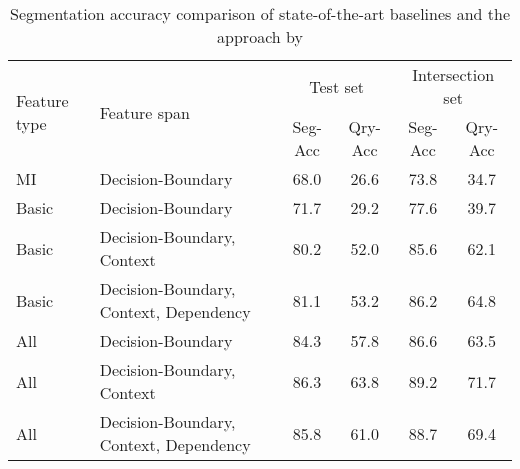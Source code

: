 \begin{table*}[t]
 \caption{Segmentation accuracy comparison of state-of-the-art baselines and the approach by \citet{Bergsma:2007}}
 \label{table-segmentation-performance-bergsma-2007}
 \centering
 \small
 \begin{tabular}{@{}llcccc@{}}
  \toprule
  \multirow{2}{*}{Feature type} & \multirow{2}{*}{Feature span} & \multicolumn{2}{c}{Test set} & \multicolumn{2}{c}{Intersection set} \\
  && Seg-Acc & Qry-Acc & Seg-Acc & Qry-Acc\\
  \midrule
  MI & Decision-Boundary & 68.0 & 26.6 & 73.8 & 34.7\\
  \midrule
  Basic & Decision-Boundary & 71.7 & 29.2 & 77.6 & 39.7\\
  Basic & Decision-Boundary, Context & 80.2 & 52.0 & 85.6 & 62.1\\
  Basic & Decision-Boundary, Context, Dependency & 81.1 & 53.2 & 86.2 & 64.8\\
  \midrule
  All & Decision-Boundary & 84.3 & 57.8 & 86.6 & 63.5\\
  All & Decision-Boundary, Context & 86.3 & 63.8 & 89.2 & 71.7\\
  All & Decision-Boundary, Context, Dependency & 85.8 & 61.0 & 88.7 & 69.4\\
  \bottomrule
 \end{tabular}
\end{table*}